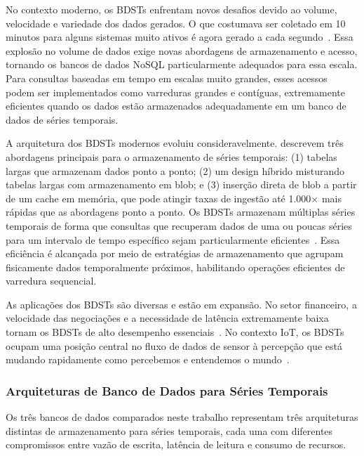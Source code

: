 No contexto moderno, os BDSTs enfrentam novos desafios devido ao volume, velocidade e variedade
dos dados gerados. O que costumava ser coletado em 10 minutos para alguns sistemas muito ativos
é agora gerado a cada segundo~\citep{Dunning2014}. Essa explosão no volume de dados exige novas
abordagens de armazenamento e acesso, tornando os bancos de dados NoSQL particularmente
adequados para essa escala. Para consultas baseadas em tempo em escalas muito grandes, esses
acessos podem ser implementados como varreduras grandes e contíguas, extremamente eficientes
quando os dados estão armazenados adequadamente em um banco de dados de séries temporais.

A arquitetura dos BDSTs modernos evoluiu consideravelmente. \cite{Dunning2014} descrevem três
abordagens principais para o armazenamento de séries temporais: (1) tabelas largas que
armazenam dados ponto a ponto; (2) um design híbrido misturando tabelas largas com armazenamento
em blob; e (3) inserção direta de blob a partir de um cache em memória, que pode atingir taxas
de ingestão até 1.000$\times$ mais rápidas que as abordagens ponto a ponto. Os BDSTs armazenam
múltiplas séries temporais de forma que consultas que recuperam dados de uma ou poucas séries
para um intervalo de tempo específico sejam particularmente eficientes~\citep{Dunning2014}.
Essa eficiência é alcançada por meio de estratégias de armazenamento que agrupam fisicamente
dados temporalmente próximos, habilitando operações eficientes de varredura sequencial.

As aplicações dos BDSTs são diversas e estão em expansão. No setor financeiro, a velocidade das
negociações e a necessidade de latência extremamente baixa tornam os BDSTs de alto desempenho
essenciais~\citep{Dunning2014}. No contexto IoT, os BDSTs ocupam uma posição central no fluxo de
dados de sensor à percepção que está mudando rapidamente como percebemos e entendemos o
mundo~\citep{Dunning2014}.

\subsubsection{Arquiteturas de Banco de Dados para Séries Temporais}

Os três bancos de dados comparados neste trabalho representam três arquiteturas distintas de
armazenamento para séries temporais, cada uma com diferentes compromissos entre vazão de escrita,
latência de leitura e consumo de recursos.

